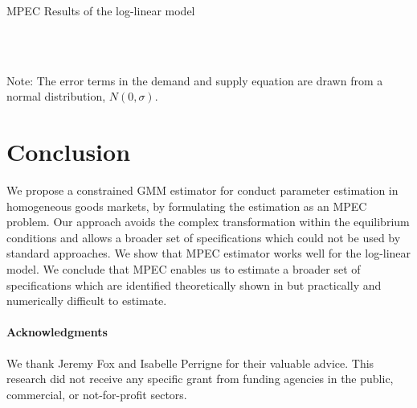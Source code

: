 \documentclass[11pt, a4paper]{article}
\begin{document}
\begin{table}[!htbp]
  \begin{center}
      \caption{MPEC Results of the log-linear model}
      \label{tb:loglinear_loglinear_sigma_2_mpec_non_constraint_theta_constraint} 
      \subfloat[$\sigma=0.001$]{}\\
      \subfloat[$\sigma=0.5$]{}\\
    \subfloat[$\sigma=2.0$]{}
  \end{center}
  \footnotesize
  Note: The error terms in the demand and supply equation are drawn from a normal distribution, $N(0, \sigma)$.
\end{table} 



\section{Conclusion}
We propose a constrained GMM estimator for conduct parameter estimation in homogeneous goods markets, by formulating the estimation as an MPEC problem. 
Our approach avoids the complex transformation within the equilibrium conditions and allows a broader set of specifications which could not be used by standard approaches. 
We show that MPEC estimator works well for the log-linear model. 
We conclude that MPEC enables us to estimate a broader set of specifications which are identified theoretically shown in \cite{lau1982identifying} but practically and numerically difficult to estimate.


\paragraph{Acknowledgments}
We thank Jeremy Fox and Isabelle Perrigne for their valuable advice. This research did not receive any specific grant from funding agencies in the public, commercial, or not-for-profit sectors. 
\end{document}
